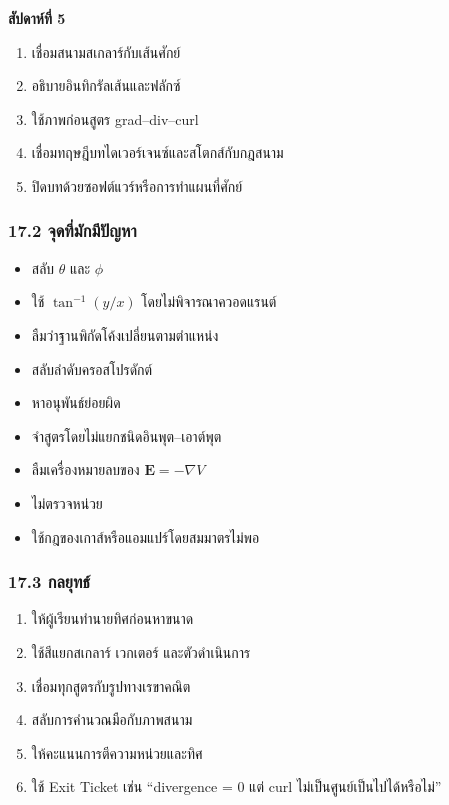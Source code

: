 \textbf{สัปดาห์ที่ 5}

\begin{enumerate}
\item เชื่อมสนามสเกลาร์กับเส้นศักย์
\item อธิบายอินทิกรัลเส้นและฟลักซ์
\item ใช้ภาพก่อนสูตร grad--div--curl
\item เชื่อมทฤษฎีบทไดเวอร์เจนซ์และสโตกส์กับกฎสนาม
\item ปิดบทด้วยซอฟต์แวร์หรือการทำแผนที่ศักย์
\end{enumerate}

\subsubsection{17.2 จุดที่มักมีปัญหา}

\begin{itemize}
\item สลับ \(\theta\) และ \(\phi\)
\item ใช้ \(\tan^{-1}(y/x)\) โดยไม่พิจารณาควอดแรนต์
\item ลืมว่าฐานพิกัดโค้งเปลี่ยนตามตำแหน่ง
\item สลับลำดับครอสโปรดักต์
\item หาอนุพันธ์ย่อยผิด
\item จำสูตรโดยไม่แยกชนิดอินพุต--เอาต์พุต
\item ลืมเครื่องหมายลบของ \(\mathbf{E}=-\nabla V\)
\item ไม่ตรวจหน่วย
\item ใช้กฎของเกาส์หรือแอมแปร์โดยสมมาตรไม่พอ
\end{itemize}

\subsubsection{17.3 กลยุทธ์}

\begin{enumerate}
\item ให้ผู้เรียนทำนายทิศก่อนหาขนาด
\item ใช้สีแยกสเกลาร์ เวกเตอร์ และตัวดำเนินการ
\item เชื่อมทุกสูตรกับรูปทางเรขาคณิต
\item สลับการคำนวณมือกับภาพสนาม
\item ให้คะแนนการตีความหน่วยและทิศ
\item ใช้ Exit Ticket เช่น ``divergence = 0 แต่ curl ไม่เป็นศูนย์เป็นไปได้หรือไม่''
\end{enumerate}

